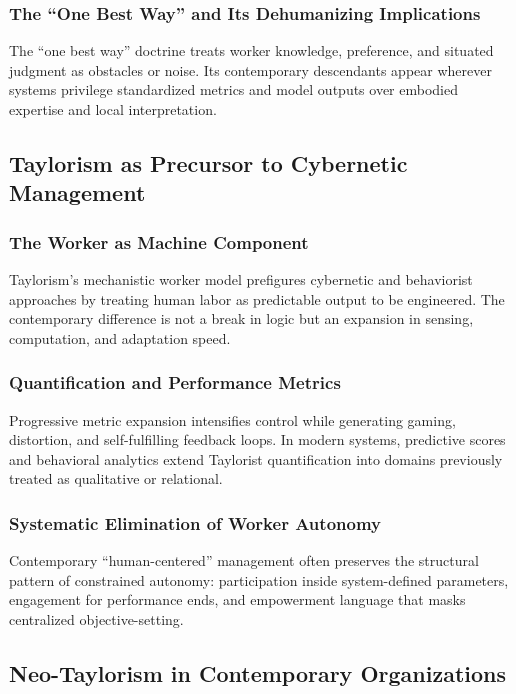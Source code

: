 \documentclass[11pt, a4paper]{article}
\begin{document}
\subsubsection{The ``One Best Way'' and Its Dehumanizing Implications}
The ``one best way'' doctrine treats worker knowledge, preference, and situated judgment as obstacles or noise. Its contemporary descendants appear wherever systems privilege standardized metrics and model outputs over embodied expertise and local interpretation.

\subsection{Taylorism as Precursor to Cybernetic Management}

\subsubsection{The Worker as Machine Component}
Taylorism's mechanistic worker model prefigures cybernetic and behaviorist approaches by treating human labor as predictable output to be engineered. The contemporary difference is not a break in logic but an expansion in sensing, computation, and adaptation speed.

\subsubsection{Quantification and Performance Metrics}
Progressive metric expansion intensifies control while generating gaming, distortion, and self-fulfilling feedback loops. In modern systems, predictive scores and behavioral analytics extend Taylorist quantification into domains previously treated as qualitative or relational.

\subsubsection{Systematic Elimination of Worker Autonomy}
Contemporary ``human-centered'' management often preserves the structural pattern of constrained autonomy: participation inside system-defined parameters, engagement for performance ends, and empowerment language that masks centralized objective-setting.

\subsection{Neo-Taylorism in Contemporary Organizations}
\end{document}
